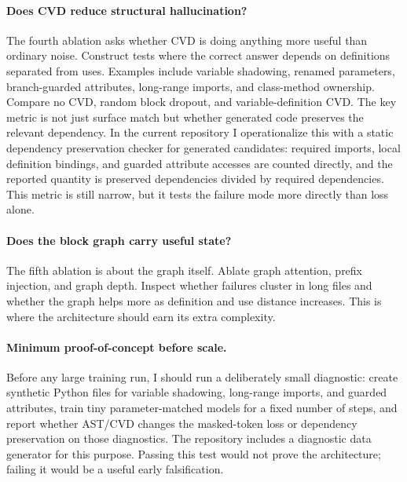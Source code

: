 \documentclass[10pt]{article}
\begin{document}
\paragraph{Does CVD reduce structural hallucination?}
The fourth ablation asks whether CVD is doing anything more useful than ordinary
noise.  Construct tests where the correct answer depends on definitions separated from
uses.  Examples include variable shadowing, renamed parameters, branch-guarded
attributes, long-range imports, and class-method ownership.  Compare no CVD,
random block dropout, and variable-definition CVD.  The key metric is not just
surface match but whether generated code preserves the relevant dependency.
In the current repository I operationalize this with a static dependency
preservation checker for generated candidates: required imports, local
definition bindings, and guarded attribute accesses are counted directly, and
the reported quantity is preserved dependencies divided by required
dependencies.  This metric is still narrow, but it tests the failure mode more
directly than loss alone.

\paragraph{Does the block graph carry useful state?}
The fifth ablation is about the graph itself.  Ablate graph attention, prefix
injection, and graph depth.  Inspect whether
failures cluster in long files and whether the graph helps more as definition
and use distance increases.  This is where the architecture should earn its
extra complexity.

\paragraph{Minimum proof-of-concept before scale.}
Before any large training run, I should run a deliberately small diagnostic:
create synthetic Python files for variable shadowing, long-range imports, and
guarded attributes, train tiny parameter-matched models for a fixed number of
steps, and report whether AST/CVD changes the masked-token loss or dependency
preservation on those diagnostics.  The repository includes a diagnostic data
generator for this purpose.  Passing this test would not prove the architecture;
failing it would be a useful early falsification.
\end{document}

